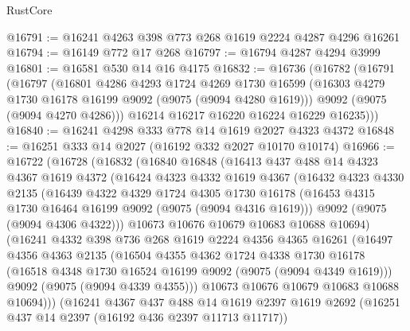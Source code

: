 \begin{lexlean}{RustCore}
\begin{coremodule}
@16791 := @16241 @4263 @398 @773 @268 @1619 @2224 @4287 @4296 @16261
@16794 := @16149 @772 @17 @268
@16797 := @16794 @4287 @4294 @3999
@16801 := @16581 @530 @14 @16 @4175
@16832 := @16736
    (@16782
      (@16791
        (@16797
          (@16801
            @4286
            @4293
            @1724
            @4269
            @1730
            @16599
            (@16303 @4279 @1730 @16178 @16199 @9092 (@9075 (@9094 @4280 @1619)))
            @9092
            (@9075 (@9094 @4270 @4286)))
          @16214
          @16217
          @16220
          @16224
          @16229
          @16235)))
@16840 := @16241 @4298 @333 @778 @14 @1619 @2027 @4323 @4372
@16848 := @16251 @333 @14 @2027 (@16192 @332 @2027 @10170 @10174)
@16966 := @16722
    (@16728
      (@16832
        (@16840
          @16848
          (@16413
            @437
            @488
            @14
            @4323
            @4367
            @1619
            @4372
            (@16424
              @4323
              @4332
              @1619
              @4367
              (@16432
                @4323
                @4330
                @2135
                (@16439
                  @4322
                  @4329
                  @1724
                  @4305
                  @1730
                  @16178
                  (@16453 @4315 @1730 @16464 @16199 @9092 (@9075 (@9094 @4316 @1619)))
                  @9092
                  (@9075 (@9094 @4306 @4322)))
                @10673
                @10676
                @10679
                @10683
                @10688
                @10694)
              (@16241
                @4332
                @398
                @736
                @268
                @1619
                @2224
                @4356
                @4365
                @16261
                (@16497
                  @4356
                  @4363
                  @2135
                  (@16504
                    @4355
                    @4362
                    @1724
                    @4338
                    @1730
                    @16178
                    (@16518 @4348 @1730 @16524 @16199 @9092 (@9075 (@9094 @4349 @1619)))
                    @9092
                    (@9075 (@9094 @4339 @4355)))
                  @10673
                  @10676
                  @10679
                  @10683
                  @10688
                  @10694)))
            (@16241
              @4367
              @437
              @488
              @14
              @1619
              @2397
              @1619
              @2692
              (@16251 @437 @14 @2397 (@16192 @436 @2397 @11713 @11717))

\end{coremodule}
\end{lexlean}
